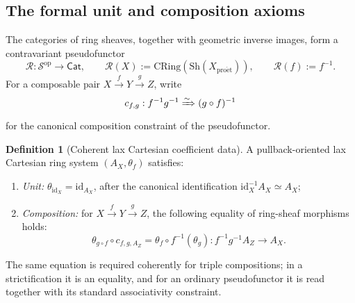 \documentclass[11pt,a4paper]{article}
\numberwithin{equation}{section}
\theoremstyle{definition}
\newtheorem{definition}[theorem]{Definition}
\theoremstyle{remark}
\newcommand{\Sh}{\mathrm{Sh}}
\newcommand{\CRing}{\mathrm{CRing}}
\newcommand{\id}{\mathrm{id}}
\newcommand{\proet}{\mathrm{pro\acute{e}t}}
\begin{document}
\subsection{The formal unit and composition axioms}

The categories of ring sheaves, together with geometric inverse images,
form a contravariant pseudofunctor
\begin{equation}\label{eq:R-pseudo}
 \mathscr R:\mathscr S^{\mathrm{op}}\longrightarrow\mathsf{Cat},
 \qquad \mathscr R(X):=\CRing(\Sh(X_{\proet})),
 \qquad \mathscr R(f):=f^{-1}.
\end{equation}
For a composable pair
$X\xrightarrow{f}Y\xrightarrow{g}Z$, write
\[
    c_{f,g}:f^{-1}g^{-1}\xRightarrow{\sim}(g\circ f)^{-1}
\]
for the canonical composition constraint of the pseudofunctor.

\begin{definition}[Coherent lax Cartesian coefficient data]
\label{def:lax-formal}
A pullback-oriented lax Cartesian ring system
$(A_X,\theta_f)$ satisfies:
\begin{enumerate}
\item \emph{Unit:} $\theta_{\id_X}=\id_{A_X}$, after the canonical
  identification $\id_X^{-1}A_X\simeq A_X$;
\item \emph{Composition:} for $X\xrightarrow fY\xrightarrow gZ$,
  the following equality of ring-sheaf morphisms holds:
\begin{equation}\label{eq:coherence}
   \boxed{\quad
   \theta_{g\circ f}\circ c_{f,g,A_Z}
      =\theta_f\circ f^{-1}(\theta_g):
            f^{-1}g^{-1}A_Z\longrightarrow A_X.\quad}
\end{equation}
\end{enumerate}
The same equation is required coherently for triple compositions;
in a strictification it is an equality, and for an ordinary
pseudofunctor it is read together with its standard associativity
constraint.
\end{definition}
\end{document}
